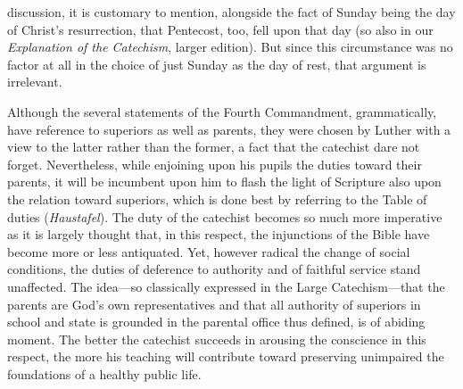 discussion, it is customary to mention, alongside the fact of Sunday being the day of Christ’s resurrection, that Pentecost, too, fell upon that day (so also in our \emph{Explanation of the Catechism}, larger edition).
But since this circumstance was no factor at all in the choice of just Sunday as the day of rest, that argument is irrelevant.

Although the several statements of the Fourth Commandment, grammatically, have reference to superiors as well as parents, they were chosen by Luther with a view to the latter rather than the former, a fact that the catechist dare not forget. Nevertheless, while enjoining upon his pupils the duties toward their parents, it will be incumbent upon him to flash the light of Scripture also upon the relation toward superiors, which is done best by referring to the Table of duties (\emph{Haustafel}). The duty of the catechist becomes so much more imperative as it is largely thought that, in this respect, the injunctions of the Bible have become more or less antiquated. Yet, however radical the change of social conditions, the duties of deference to authority and of faithful service stand unaffected. The idea—so classically expressed in the Large Catechism—that the parents are God’s own representatives and that all authority of superiors in school and state is grounded in the parental office thus defined, is of abiding moment. The better the catechist succeeds in arousing the conscience in this respect, the more his teaching will contribute toward preserving unimpaired the foundations of a healthy public life.


